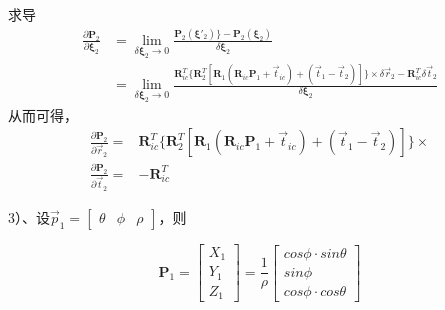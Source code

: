 \documentclass{article}
\begin{document}
求导
\begin{equation}
	\begin{aligned}
		\frac{\partial{\boldsymbol{P}_2}}{\partial{\boldsymbol{\xi}_2}} & = 
		\lim_{\delta\boldsymbol{\xi}_2\rightarrow0}\frac{\boldsymbol{P}_2(\boldsymbol{\xi}'_2)\}-  \boldsymbol{P}_2(\boldsymbol{\xi}_2)}{\delta\boldsymbol{\xi}_2}\\&=
		\lim_{\delta\boldsymbol{\xi}_2\rightarrow0}\frac{\boldsymbol{R}_{ic}^{T}\{\boldsymbol{R}_2^{T}[\boldsymbol{R}_1(\boldsymbol{R}_{ic}\boldsymbol{P}_1+\vec{t}_{ic})+(\vec{t}_1-\vec{t}_2)]\}\times\delta\vec{r}_2 - \boldsymbol{R}_{ic}^{T}\delta\vec{t}_2}{\delta\boldsymbol{\xi}_2}
	\end{aligned}
\end{equation}
从而可得，
\begin{equation}
	\begin{aligned}
		\frac{\partial{\boldsymbol{P}_2}}{\partial{\vec{r}_2}}= & \boldsymbol{R}_{ic}^{T}\{\boldsymbol{R}_2^{T}[\boldsymbol{R}_1(\boldsymbol{R}_{ic}\boldsymbol{P}_1+\vec{t}_{ic})+(\vec{t}_1-\vec{t}_2)]\}\times \\
		\frac{\partial{\boldsymbol{P}_2}}{\partial{\vec{t}_2}}= & -\boldsymbol{R}_{ic}^{T}                                                                                                                        
	\end{aligned}
\end{equation}

3）、设$\vec{p}_1=
\left[
	\begin{matrix} 
		\theta & \phi & \rho 
	\end{matrix}
\right]$，则

\begin{equation}
	\boldsymbol{P}_1=
	\left[\begin{matrix}X_1  \\ 
		Y_1 \\
		Z_1
	\end{matrix}\right]
	=\frac{1}{\rho}  
	\left[
		\begin{matrix}
			cos\phi \cdot sin\theta \\
			sin\phi                 \\
			cos\phi \cdot cos\theta 
		\end{matrix}
	\right]
\end{equation}
\end{document}
